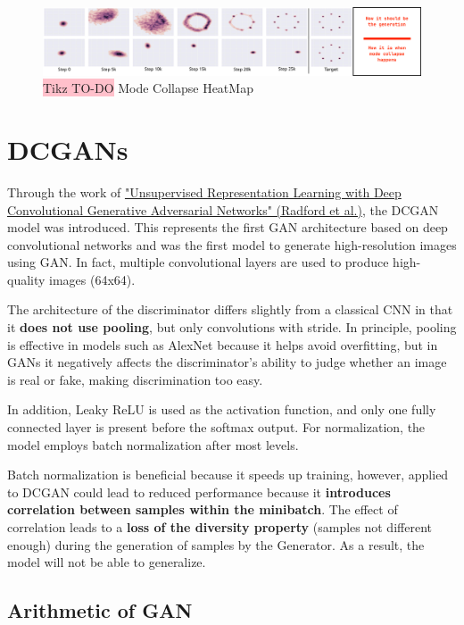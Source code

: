 \begin{figure}[!htbp]
    \centering
    \includegraphics[width=\linewidth]{tikz/chapter9 - Mode Collapse HeatMap.png}
    \caption{{\color{red}\colorbox{pink}{Tikz TO-DO}} Mode Collapse HeatMap}
\end{figure}


\section{DCGANs}

Through the work of \href{https://arxiv.org/pdf/1511.06434}{"Unsupervised Representation Learning with Deep Convolutional Generative Adversarial Networks" (Radford et al.)}, the DCGAN model was introduced. This represents the first GAN architecture based on deep convolutional networks and was the first model to generate high-resolution images using GAN. In fact, multiple convolutional layers are used to produce high-quality images (64x64).

The architecture of the discriminator differs slightly from a classical CNN in that it \textbf{does not use pooling}, but only convolutions with stride. In principle, pooling is effective in models such as AlexNet because it helps avoid overfitting, but in GANs it negatively affects the discriminator's ability to judge whether an image is real or fake, making discrimination too easy.

In addition, Leaky ReLU is used as the activation function, and only one fully connected layer is present before the softmax output. For normalization, the model employs batch normalization after most levels.

Batch normalization is beneficial because it speeds up training, however, applied to DCGAN could lead to reduced performance because it \textbf{introduces correlation between samples within the minibatch}. The effect of correlation leads to a \textbf{loss of the diversity property} (samples not different enough) during the generation of samples by the Generator. As a result, the model will not be able to generalize.

\subsection{Arithmetic of GAN}

